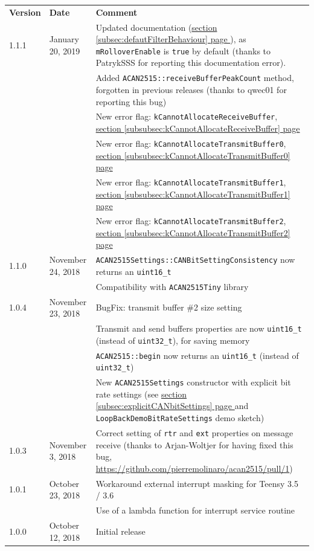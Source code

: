 \documentclass[10pt, a4paper, obeyspaces]{extarticle}
\newcommand\refSubsectionPage[1]{\hyperref[subsec:#1]{section \ref*{subsec:#1} page \pageref{subsec:#1}}}
\newcommand\refSubsubsectionPage[1]{\hyperref[subsubsec:#1]{section \ref*{subsubsec:#1} page \pageref{subsubsec:#1}}}
\begin{document}
\begin{center}
  \small
  \begin{tabular}{llp{11cm}}
    \textbf{Version} & \textbf{Date} & \textbf{Comment}\\
    1.1.1 & January 20, 2019 & Updated documentation (\refSubsectionPage{defautFilterBehaviour}), as \texttt{mRolloverEnable} is \texttt{true} by default (thanks to PatrykSSS for reporting this documentation error).\\
          &                   & Added \texttt{ACAN2515::receiveBufferPeakCount} method, forgotten in previous releases (thanks to qwec01 for reporting this bug)\\
          &                   & New error flag: \texttt{kCannotAllocateReceiveBuffer}, \refSubsubsectionPage{kCannotAllocateReceiveBuffer}\\
          &                   & New error flag: \texttt{kCannotAllocateTransmitBuffer0}, \refSubsubsectionPage{kCannotAllocateTransmitBuffer0}\\
          &                   & New error flag: \texttt{kCannotAllocateTransmitBuffer1}, \refSubsubsectionPage{kCannotAllocateTransmitBuffer1}\\
          &                   & New error flag: \texttt{kCannotAllocateTransmitBuffer2}, \refSubsubsectionPage{kCannotAllocateTransmitBuffer2}\\
    1.1.0 & November 24, 2018 & \texttt{ACAN2515Settings::CANBitSettingConsistency} now returns an \texttt{uint16\_t} \\
          &                   & Compatibility with \texttt{ACAN2515Tiny} library\\
    1.0.4 & November 23, 2018 & BugFix: transmit buffer \#2 size setting \\
          &                   & Transmit and send buffers properties are now \texttt{uint16\_t} (instead of \texttt{uint32\_t}), for saving memory \\
          &                   & \texttt{ACAN2515::begin} now returns an \texttt{uint16\_t} (instead of \texttt{uint32\_t})\\
          &                   & New \texttt{ACAN2515Settings} constructor with explicit bit rate settings (see \refSubsectionPage{explicitCANbitSettings} and \texttt{LoopBackDemoBitRateSettings} demo sketch)\\
    1.0.3 & November 3, 2018 & Correct setting of \texttt{rtr} and \texttt{ext} properties on message receive (thanks to Arjan-Woltjer for having fixed this bug, \url{https://github.com/pierremolinaro/acan2515/pull/1}) \\
    1.0.1 & October 23, 2018 & Workaround external interrupt masking for Teensy 3.5 / 3.6\\
          &                  & Use of a lambda function for interrupt service routine \\
    1.0.0 & October 12, 2018 & Initial release \\
  \end{tabular}
\end{center}
\end{document}
